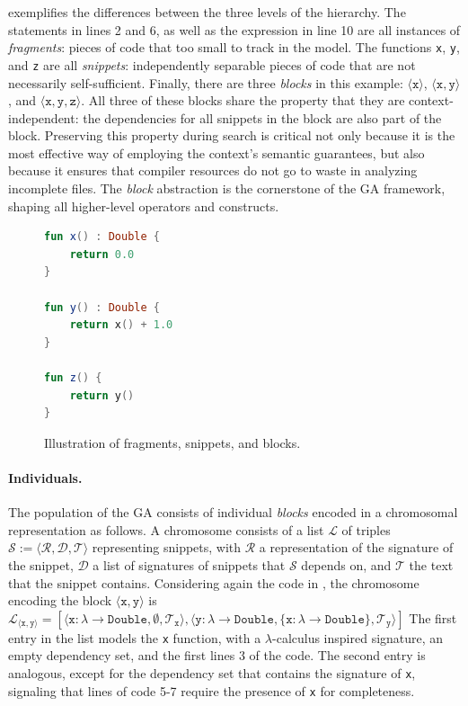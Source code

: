  exemplifies the differences between the three levels
of the hierarchy.
The statements in lines 2 and 6, as well as the expression
in line 10 are all instances of \textit{fragments}: pieces
of code that too small to track in the model.
The functions \texttt{x}, \texttt{y}, and \texttt{z} are all \textit{snippets}:
independently separable pieces of code that are not necessarily self-sufficient.
Finally, there are three \textit{blocks} in this example: $\langle \texttt{x} \rangle$,
$\langle \texttt{x}, \texttt{y} \rangle$,
and $\langle \texttt{x}, \texttt{y}, \texttt{z} \rangle$.
All three of these blocks share the property that they are context-independent:
the dependencies for all snippets in the block are also part of the block.
Preserving this property during search is critical not only because it is the most
effective way of employing the context's semantic guarantees,
but also because it ensures that compiler resources do not go to waste
in analyzing incomplete files.
The \textit{block} abstraction is the cornerstone of the 
\gls{GA} framework, shaping all higher-level operators and constructs.

\begin{figure}
\begin{lstlisting}[language=Kotlin]
fun x() : Double {
	return 0.0
}

fun y() : Double {
	return x() + 1.0
}

fun z() {
	return y()
}
\end{lstlisting}
\caption{Illustration of fragments, snippets, and blocks.}
\label{fig:blocks}
\end{figure}

\paragraph{Individuals.} The population of the \gls{GA} consists
of individual \textit{blocks} encoded in a chromosomal representation as follows.
A chromosome consists of a list $\mathcal{L}$ of triples
$\mathcal{S} := \langle \mathcal{R}, \mathcal{D}, \mathcal{T} \rangle$ representing snippets,
with $\mathcal{R}$ a representation of the signature of the snippet,
$\mathcal{D}$ a list of signatures of snippets that $\mathcal{S}$ depends on,
and $\mathcal{T}$ the text that the snippet contains.
Considering again the code in ,
the chromosome encoding the block $\langle \texttt{x}, \texttt{y} \rangle$
is $\mathcal{L}_{\langle \texttt{x}, \texttt{y} \rangle} =
[ \langle
\texttt{x} : \lambda \to \texttt{Double}, \emptyset, \mathcal{T}_{\texttt{x}}\rangle,
\langle \texttt{y} : \lambda \to \texttt{Double},
\{ \texttt{x} : \lambda \to \texttt{Double} \}, \mathcal{T}_{\texttt{y}} \rangle ]$
The first entry in the list models the \texttt{x} function, with a
$\lambda$-calculus inspired signature, an empty dependency set, and
the first lines 3 of the code.
The second entry is analogous, except for the dependency set 
that contains the signature of \texttt{x}, signaling that
lines of code 5-7 require the presence of \texttt{x} for completeness.

